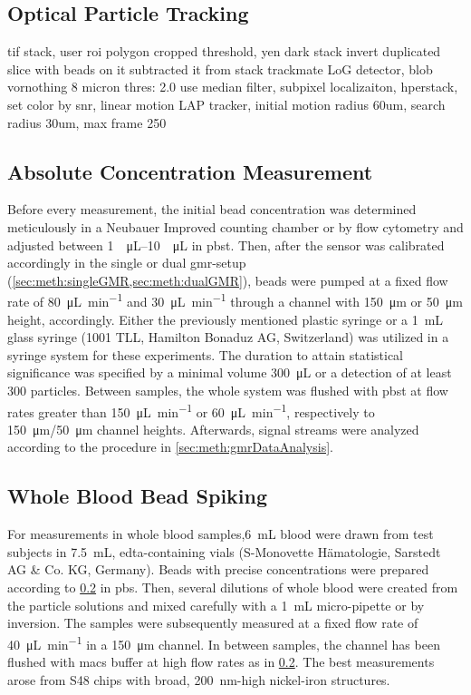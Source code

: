 \subsection{Optical Particle Tracking}
\textcolor{Oorange}{tif stack,
user roi polygon 
cropped
threshold, yen dark stack
invert
duplicated slice with beads on it
subtracted it from stack
trackmate
LoG detector, blob vornothing 8 micron
thres: 2.0
use median filter, subpixel localizaiton, hperstack, set color by snr, 
linear motion LAP tracker, initial motion radius 60um, search radius 30um, max frame 250}
\subsection{Absolute Concentration Measurement}
\label{sec:meth:conc}
Before every measurement, the initial bead concentration was determined meticulously in a Neubauer Improved counting chamber or by flow cytometry and adjusted between \SIrange{1}{10}{\per\micro\liter} in \gls{pbst}. Then, after the sensor was calibrated accordingly in the single or dual \gls{gmr}-setup (\cref{sec:meth:singleGMR,sec:meth:dualGMR}), beads were pumped at a fixed flow rate of \SI{80}{\micro\liter\per\minute} and \SI{30}{\micro\liter\per\minute} through a channel with \SI{150}{\micro\meter} or \SI{50}{\micro\meter} height, accordingly. Either the previously mentioned plastic syringe or a \SI{1}{\milli\liter} glass syringe (1001 TLL, Hamilton Bonaduz AG, Switzerland) was utilized in a syringe system for these experiments. The duration to attain statistical significance was specified by a minimal volume \SI{300}{\micro\liter} or a detection of at least \num{300} particles. Between samples, the whole system was flushed with \gls{pbst} at flow rates greater than \SI{150}{\micro\liter\per\minute} or \SI{60}{\micro\liter\per\minute}, respectively to \SI{150}{\micro\meter}/\SI{50}{\micro\meter} channel heights. Afterwards, signal streams were analyzed according to the procedure in \cref{sec:meth:gmrDataAnalysis}.
\subsection{Whole Blood Bead Spiking}
For measurements in whole blood samples,\SI{6}{\milli\liter} blood were drawn from test subjects in \SI{7.5}{\milli\liter}, \gls{edta}-containing vials (S-Monovette Hämatologie, Sarstedt AG \& Co. KG, Germany). Beads with precise concentrations were prepared according to \cref{sec:meth:conc} in \gls{pbs}. Then, several dilutions of whole blood were created from the particle solutions and mixed carefully with a \SI{1}{\milli\liter} micro-pipette or by inversion. The samples were subsequently measured at a fixed flow rate of \SI{40}{\micro\liter\per\minute} in a \SI{150}{\micro\meter} channel. In between samples, the channel has been flushed with \gls{macs} buffer at high flow rates as in \cref{sec:meth:conc}. The best measurements arose from S48 chips with broad, \SI{200}{\nano\meter}-high nickel-iron structures.
